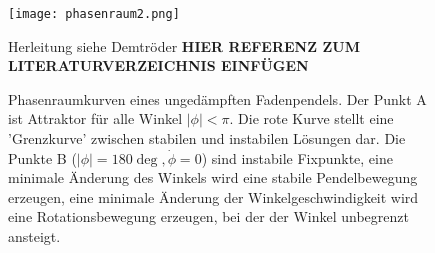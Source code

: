 \begin{figure}
\texttt{[image: phasenraum2.png]}
\caption{Phasenraumkurven eines ungedämpften Fadenpendels. Der Punkt A ist Attraktor für alle Winkel $|\phi|<\pi$. Die rote Kurve stellt eine 'Grenzkurve' zwischen stabilen und instabilen Lösungen dar. Die Punkte B ($|\phi|=180\deg, \dot{\phi}=0$) sind instabile Fixpunkte, eine minimale Änderung des Winkels wird eine stabile Pendelbewegung erzeugen, eine minimale Änderung der Winkelgeschwindigkeit wird eine Rotationsbewegung erzeugen, bei der der Winkel unbegrenzt ansteigt.}
Herleitung siehe Demtröder \textbf{HIER REFERENZ ZUM LITERATURVERZEICHNIS EINFÜGEN}
\end{figure}
